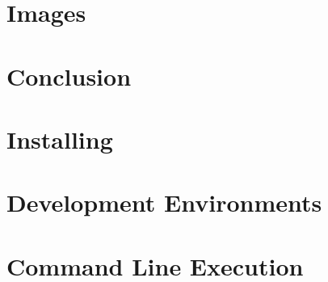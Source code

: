 \documentclass{article}
\begin{document}
    \section{Images}
    \label{Images}

    \section{Conclusion}
    \label{Conclusion}

	\newpage{}

	\appendix{}

	\section{Installing \LaTeXe}
	\label{Installing}


	\section{Development Environments}
	\label{Development Environments}


	\section{Command Line Execution}
	\label{Command Line}

	\theendnotes{}
\end{document}
